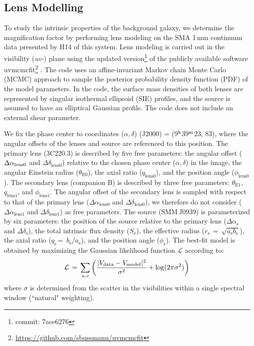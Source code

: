 \documentclass[twocolumn,apj,numberedappendix]{emulateapj}
\begin{document}
\subsection{Lens Modelling} \label{sec:Lens}
To study the intrinsic properties of the background galaxy, we determine the magnification factor by performing
lens modeling on the SMA 1\,mm continuum data presented by H14 of this system. Lens modeling is carried out in the visibility
({\it uv-}) plane using the updated version\footnote{commit: 7aee6276} of the publicly available software {\sc uvmcmcfit}\footnote{\url{https://github.com/sbussmann/uvmcmcfit}}
\citep{Bussmann15a}. The code uses an affine-invariant Markov chain Monte Carlo (MCMC) approach to sample the posterior
probability density function (PDF) of the model parameters. In the code, the surface mass densities of both
lenses are represented by singular isothermal ellipsoid (SIE) profiles, and the source is assumed to have an
elliptical Gaussian profile. The code does not include an external shear parameter.

We fix the phase center to coordinates ($\alpha$,\,$\delta$)\,\,(J2000) = (9$^{\rm h}$39$^{\rm m}$23,\,\,83), where the
angular offsets of the lenses and source are referenced to this position. The primary lens (3C220.3) is
described by five free parameters: the angular offset ($\Delta \alpha_{\rm
lens0}$ and $\Delta \delta_\textrm{lens0}$) relative to
the chosen phase center ($\alpha$,\,$\delta$) in the image, the angular Einstein radius ($\theta_\textrm{E0}$), the
axial ratio ($q_\textrm{lens0}$), and the position angle ($\phi_\textrm{lens0}$). The secondary lens (companion B) is
described by three free parameters: $\theta_\textrm{E1}$, $q_\textrm{lens1}$, and $\phi_\textrm{lens1}$. The angular offset
of the secondary
lens is sampled with respect to that of
the primary lens ($\Delta \alpha_\textrm{lens0}$ and $\Delta \delta_\textrm{lens0}$), we therefore do not consider ($\Delta \alpha_\textrm{lens1}$ and $\Delta \delta_\textrm{lens1}$)  as free parameters.
The source (SMM\,J0939) is parameterized by
six parameters: the position of the source relative to the
primary lens ($\Delta \alpha_\textrm{s}$ and $\Delta
\delta_\textrm{s}$), the total intrinsic flux density ($S_\nu$), the
effective radius ($r_\textrm{s}\,=\,\sqrt{a_\textrm{s} b_\textrm{s}}$), the axial
ratio ($q_\textrm{s}$\,=\, $b_\textrm{s}/a_\textrm{s}$), and the position angle
($\phi_\textrm{s}$).
The best-fit model is obtained by maximizing the
Gaussian likelihood function $ \mathcal{L} $ according to:
\begin{equation}
    \mathcal{L}\,=\,\sum_{u, v}\left( \frac{|V_\textrm{data} - V_{\rm
    model}|^2}{\sigma^2} + {\rm log}(2 \pi \sigma^2) \right)
\end{equation}
\noindent where $\sigma$ is determined from the scatter in the visibilities within a
single spectral window (``natural" weighting).
\end{document}
